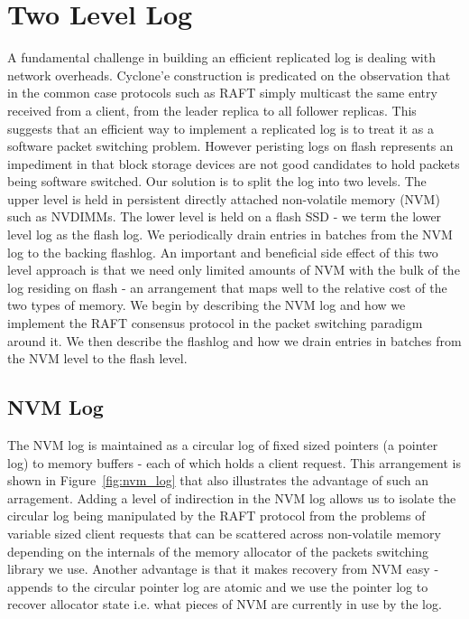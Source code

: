 \documentclass[10pt, preprint, nonatbib]{sigplanconf}
\begin{document}
\section{Two Level Log}
\label{sec:2level}
A fundamental challenge in building an efficient replicated log is dealing with
network overheads. Cyclone'e construction is predicated on the observation that
in the common case protocols such as RAFT simply multicast the same entry
received from a client, from the leader replica to all follower replicas. This
suggests that an efficient way to implement a replicated log is to treat it as a
software packet switching problem. However peristing logs on flash represents an
impediment in that block storage devices are not good candidates to hold packets
being software switched. Our solution is to split the log into two levels. The
upper level is held in persistent directly attached non-volatile memory (NVM)
such as NVDIMMs. The lower level is held on a flash SSD - we term the lower
level log as the flash log. We periodically drain entries in batches from the
NVM log to the backing flashlog. An important and beneficial side effect of this
two level approach is that we need only limited amounts of NVM with the bulk of
the log residing on flash - an arrangement that maps well to the relative cost
of the two types of memory. We begin by describing the NVM log and how we
implement the RAFT consensus protocol in the packet switching paradigm around
it. We then describe the flashlog and how we drain entries in batches from the
NVM level to the flash level.

\subsection{NVM Log}
The NVM log is maintained as a circular log of fixed sized pointers (a pointer
log) to memory buffers - each of which holds a client request. This arrangement
is shown in Figure~\ref{fig:nvm_log} that also illustrates the advantage of
such an arragement. Adding a level of indirection in the NVM log allows us to
isolate the circular log being manipulated by the RAFT protocol from the
problems of variable sized client requests that can be scattered across
non-volatile memory depending on the internals of the memory allocator of the
packets switching library we use. Another advantage is that it makes recovery
from NVM easy - appends to the circular pointer log are atomic and we use the
pointer log to recover allocator state i.e. what pieces of NVM are currently in
use by the log.
\end{document}
